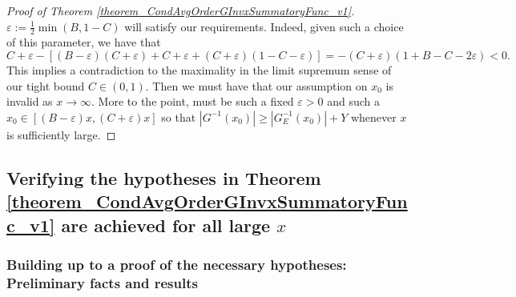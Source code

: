 \documentclass[11pt,reqno,a4letter]{article}
\numberwithin{figure}{section}
\numberwithin{table}{section}
\theoremstyle{plain}
\numberwithin{theorem}{section}
\theoremstyle{definition}
\begin{document}
\begin{proof}[Proof of Theorem \ref{theorem_CondAvgOrderGInvxSummatoryFunc_v1}]
$\varepsilon := \frac{1}{2} \min(B, 1-C)$ will satisfy our requirements. 
Indeed, given such a choice of this parameter, we have that 
\[
C + \varepsilon - \left[(B-\varepsilon) (C+\varepsilon) + C + \varepsilon + (C + \varepsilon) (1 - C - \varepsilon)\right] = 
     -(C + \varepsilon)(1 + B - C - 2\varepsilon) < 0. 
\]
This implies a contradiction to the maximality in the limit supremum sense of our tight bound $C \in (0, 1)$. 
Then we must have that our assumption on $x_0$ is invalid as $x \rightarrow \infty$. 
More to the point, must be such a fixed $\varepsilon > 0$ and such a $x_0 \in [(B-\varepsilon) x, (C+\varepsilon) x]$ 
so that $|G^{-1}(x_0)| \geq |G_E^{-1}(x_0)| + Y$ whenever $x$ is sufficiently large.  
\end{proof} 

\subsection{Verifying the hypotheses in Theorem \ref{theorem_CondAvgOrderGInvxSummatoryFunc_v1} 
            are achieved for all large $x$} 
\label{subSection_ProvingTheNecessaryHyps_ThmCondAvgOrderGInvxSummatoryFunc_v1} 

\subsubsection{Building up to a proof of the necessary hypotheses: Preliminary facts and results} 
\label{subsubSection_ProvingTheNecessaryHyps_PrelimFactPfs} 
\end{document}
